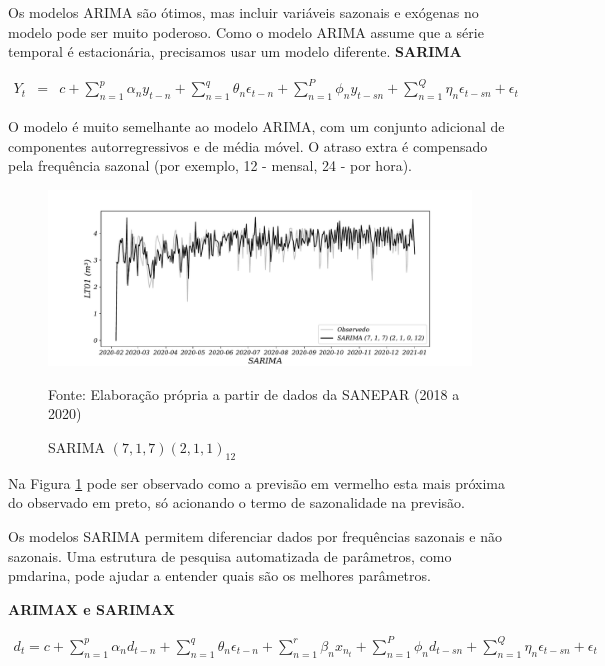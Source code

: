 Os modelos ARIMA são ótimos, mas incluir variáveis sazonais e exógenas no modelo pode ser muito poderoso. Como o modelo ARIMA assume que a série temporal é estacionária, precisamos usar um modelo diferente.
\textbf{SARIMA}

\begin{eqnarray}
	Y_t&=&c+\sum_{n=1}^p \alpha_n y_{t-n}+\sum_{n=1}^q \theta_n \epsilon_{t-n}+\sum_{n=1}^P \phi_n y_{t-s n}+\sum_{n=1}^Q \eta_n \epsilon_{t-s n}+\epsilon_t \label{sarima}
\end{eqnarray}

O modelo é muito semelhante ao modelo ARIMA, com um conjunto adicional de componentes autorregressivos e de média móvel. O atraso extra é compensado pela frequência sazonal (por exemplo, 12 - mensal, 24 - por hora). 

\begin{figure}[H]
	\centering
	\caption{SARIMA $(7,1,7) (2,1,1)_{12}$}
	\label{fig:1-sarima}
	\includegraphics[width=1\linewidth]{Modelos/Figuras/0-SARIMA}
	
	Fonte: Elaboração própria a partir de dados da SANEPAR (2018 a 2020)
\end{figure}

Na Figura \ref{fig:1-sarima} pode ser observado como a previsão em vermelho esta mais próxima do observado em preto, só acionando o termo de sazonalidade na previsão. 

Os modelos SARIMA permitem diferenciar dados por frequências sazonais e não sazonais. Uma estrutura de pesquisa automatizada de parâmetros, como pmdarina, pode ajudar a entender quais são os melhores parâmetros.

\textbf{ARIMAX e SARIMAX}

\begin{eqnarray}
	d_t=c+\sum_{n=1}^p \alpha_n d_{t-n}+\sum_{n=1}^q \theta_n \epsilon_{t-n}+\sum_{n=1}^r \beta_n x_{n_t}+\sum_{n=1}^P \phi_n d_{t-s n}+\sum_{n=1}^Q \eta_n \epsilon_{t-s n}+\epsilon_t \label{eq:sarmax}
\end{eqnarray}

